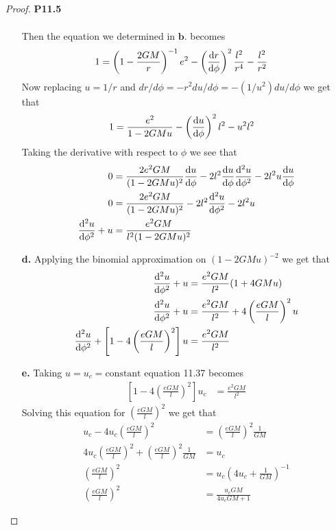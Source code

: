 \documentclass[11pt]{article}
\theoremstyle{definition}
\begin{document}
\begin{proof}{\textbf{P11.5}}
\begin{itemize}
\begin{align*}
    \end{align*}
    Then the equation we determined in $\textbf{b.}$ becomes
    \begin{align*}
        1 &= \left(1 - \frac{2GM}{r}\right)^{-1}e^2
        - \left(\dv{r}{\phi}\right)^2\frac{l^2}{r^4}
        - \frac{l^2}{r^2}
    \end{align*}
    Now replacing $u = 1/r$ and $dr/d\phi = -r^2 du/d\phi = -(1/u^2)du/d\phi$
    we get that
    \begin{align*}
        1 &= \frac{e^2}{1 - 2GMu} - \left(\dv{u}{\phi}\right)^2l^2 - u^2 l^2
    \end{align*}
    Taking the derivative with respect to $\phi$ we see that
    \begin{align*}
        0 &= \frac{2e^2GM}{(1 - 2GMu)^2}\dv{u}{\phi}
        - 2l^2\dv{u}{\phi}\dv[2]{u}{\phi} - 2l^2u\dv{u}{\phi}\\
        0 &= \frac{2e^2GM}{(1 - 2GMu)^2} - 2l^2\dv[2]{u}{\phi} - 2l^2u\\
        \dv[2]{u}{\phi} + u &= \frac{e^2GM}{l^2(1 - 2GMu)^2}
    \end{align*}
    \item [\textbf{d.}]
    Applying the binomial approximation on $(1 - 2GMu)^{-2}$ we get that
    \begin{align*}
        \dv[2]{u}{\phi} + u &= \frac{e^2GM}{l^2}(1 + 4GMu)\\
        \dv[2]{u}{\phi} + u &= \frac{e^2GM}{l^2} + 4\left(\frac{eGM}{l}\right)^2u\\
        \dv[2]{u}{\phi} + \left[1 - 4\left(\frac{eGM}{l}\right)^2\right]u
        &= \frac{e^2GM}{l^2}
    \end{align*}
    \item [\textbf{e.}] Taking $u = u_c = \text{constant}$ equation 11.37
    becomes
    \begin{align*}
        \left[1 - 4\left(\frac{eGM}{l}\right)^2\right]u_c &= \frac{e^2GM}{l^2}
    \end{align*}
    Solving this equation for $(\frac{eGM}{l})^2$ we get that
    \begin{align*}
        u_c - 4u_c\left(\frac{eGM}{l}\right)^2
        &= \left(\frac{eGM}{l}\right)^2\frac{1}{GM}\\
        4u_c\left(\frac{eGM}{l}\right)^2 + \left(\frac{eGM}{l}\right)^2\frac{1}{GM}
        &= u_c\\
        \left(\frac{eGM}{l}\right)^2
        &= u_c\left(4u_c + \frac{1}{GM}\right)^{-1}\\
        \left(\frac{eGM}{l}\right)^2 &= \frac{u_c GM}{4u_cGM + 1}

\end{align*}
\end{itemize}
\end{proof}
\end{document}
